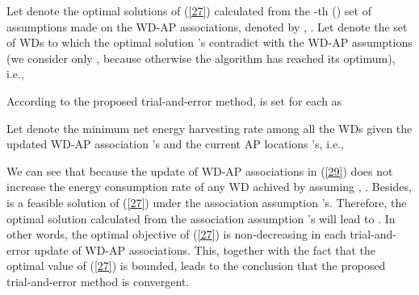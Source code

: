\documentclass[journal, draftcls, one column, 12pt]{IEEEtran}
\begin{document}
 \label{59}
Let  denote the optimal solutions of (\ref{27}) calculated from the -th () set of assumptions made on the WD-AP associations, denoted by , . Let  denote the set of WDs to which the optimal solution 's contradict with the WD-AP assumptions (we consider only , because otherwise the algorithm has reached its optimum), i.e.,

According to the proposed trial-and-error method,  is set for each  as


Let  denote the minimum net energy harvesting rate among all the WDs given the updated WD-AP association 's and the current AP locations 's, i.e.,

We can see that  because the update of WD-AP associations in (\ref{29}) does not increase the energy consumption rate of any WD achived by assuming , . Besides,  is a feasible solution of (\ref{27}) under the association assumption 's. Therefore, the optimal solution  calculated from the association assumption 's will lead to . In other words, the optimal objective of (\ref{27}) is non-decreasing in each trial-and-error update of WD-AP associations. This, together with the fact that the optimal value of (\ref{27}) is bounded, leads to the conclusion that the proposed trial-and-error method is convergent.
\end{document}
